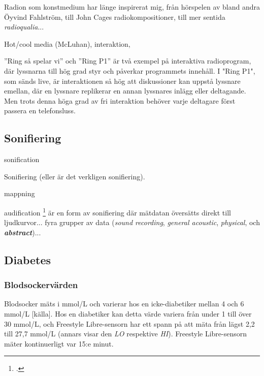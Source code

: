 \documentclass[11pt, a4paper]{article} %
\begin{document}
Radion som konstmedium har länge inspirerat mig, från hörspelen av bland andra Öyvind Fahlström, till John Cages radiokompositioner, till mer sentida \emph{radioqualia}... 

Hot/cool media (McLuhan), interaktion, 

''Ring så spelar vi'' och ''Ring P1'' är två exempel på interaktiva radioprogram, där lyssnarna till hög grad styr och påverkar programmets innehåll. I "Ring P1", som sänds live, är interaktionen så hög att diskussioner kan uppstå lyssnare emellan, där en lyssnare replikerar en annan lyssnares inlägg eller deltagande. Men trots denna höga grad av fri interaktion behöver varje deltagare först passera en telefonsluss. 


\subsection*{Sonifiering}

\gls{sonification}


Sonifiering (eller är det verkligen sonifiering). %

\gls{mappning}

\gls{audification} \footcite[302]{noauthor_sonification_2011} är en form av sonifiering där mätdatan översätts direkt till ljudkurvor... fyra grupper av data (\emph{sound recording}, \emph{general acoustic}, \emph{physical}, och \textbf{\emph{abstract}})...

\subsection*{Diabetes}

\subsubsection*{Blodsockervärden}
Blodsocker mäts i mmol/L och varierar hos en icke-diabetiker mellan 4 och 6 mmol/L [källa]. Hos en diabetiker kan detta värde variera från under 1 till över 30 mmol/L, och Freestyle Libre-sensorn har ett spann på att mäta från lägst 2,2 till 27,7 mmol/L (annars visar den \emph{LO} respektive \emph{HI}). Freestyle Libre-sensorn mäter kontinuerligt var 15:e minut.
\end{document}
